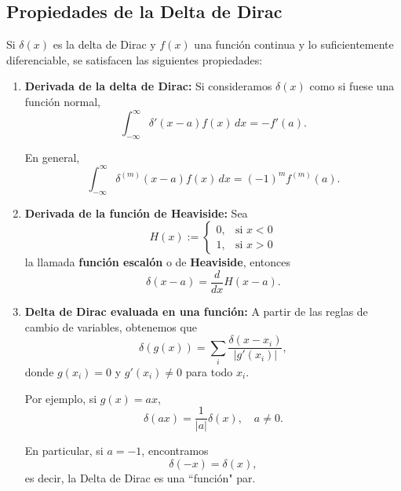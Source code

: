 \subsection*{Propiedades de la Delta de Dirac}

Si $\delta(x)$ es la delta de Dirac y $f(x)$ una función continua y lo suficientemente diferenciable, se satisfacen las siguientes propiedades:
\begin{enumerate}
    \item \textbf{Derivada de la delta de Dirac:} Si consideramos $\delta(x)$ como si fuese una función normal,
    \begin{equation}
        \int_{-\infty}^{\infty} \delta'(x-a) f(x) \,dx = -f'(a).
    \end{equation}

    En general,
    \begin{equation}
        \int_{-\infty}^{\infty} \delta^{(m)}(x-a) f(x) \,dx = (-1)^{m} f^{(m)}(a).
    \end{equation}

    \item \textbf{Derivada de la función de Heaviside:} Sea 
    \begin{equation}
        H(x) := \left\{ \begin{array}{cl}
            0, & \text{si $x < 0$}  \\
            1, & \text{si $x > 0$} 
        \end{array}\right.
    \end{equation}
    la llamada \textbf{función escalón} o de \textbf{Heaviside}, entonces
    \begin{equation}
        \delta(x-a) = \frac{d}{dx}H(x-a).
    \end{equation}

    \item \textbf{Delta de Dirac evaluada en una función:} A partir de las reglas de cambio de variables, obtenemos que
    \begin{equation}
        \delta(g(x)) = \sum_{i} \frac{\delta(x-x_i)}{|g'(x_i)|},
    \end{equation}
    donde $g(x_i) = 0$ y $g'(x_i) \neq 0$ para todo $x_i$.

    Por ejemplo, si $g(x) = ax$, 
    \begin{equation}
        \delta(ax) = \frac{1}{|a|} \delta(x), \quad a\neq 0.
    \end{equation}

    En particular, si $a = -1$, encontramos
    \begin{equation}
        \delta(-x) = \delta(x),
    \end{equation}
    es decir, la Delta de Dirac es una ``función" par.


\end{enumerate}
